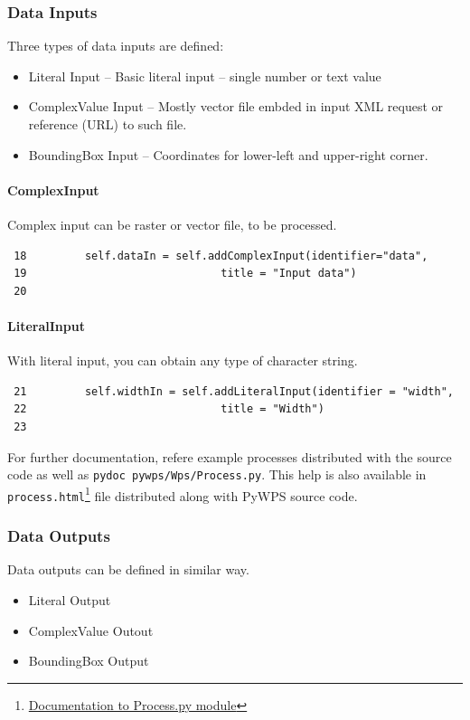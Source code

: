 \documentclass[a4paper,11pt]{article}
\begin{document}
\subsubsection{Data Inputs}

Three types of data inputs are defined:
\begin{itemize}
    \item Literal Input -- Basic literal input -- single number or text
    value
    \item ComplexValue Input  -- Mostly vector file embded in input XML
    request or reference (URL) to such file.
    \item BoundingBox Input -- Coordinates for lower-left and upper-right
    corner.
\end{itemize}


\paragraph{ComplexInput}
Complex input can be raster or vector file, to be processed. 

\begin{verbatim}
 18         self.dataIn = self.addComplexInput(identifier="data",
 19                              title = "Input data")
 20 
\end{verbatim}

\paragraph{LiteralInput}

With literal input, you can obtain any type of character string.

\begin{verbatim}
 21         self.widthIn = self.addLiteralInput(identifier = "width",
 22                              title = "Width")
 23 
\end{verbatim}

For further documentation, refere example processes distributed with the
source code as well as \texttt{pydoc~pywps/Wps/Process.py}. This help is
also available in
\texttt{process.html}\footnote{\href{http://wald.intevation.org/plugins/scmsvn/viewcvs.php/*checkout*/trunk/doc/process.html?rev=369&root=pywps}{Documentation
to Process.py module}} file distributed along with PyWPS
source code.

\subsubsection{Data Outputs}
Data outputs can be defined in similar way.
\begin{itemize}
    \item Literal Output
    \item ComplexValue Outout
    \item BoundingBox Output
\end{itemize}
    
\end{document}
